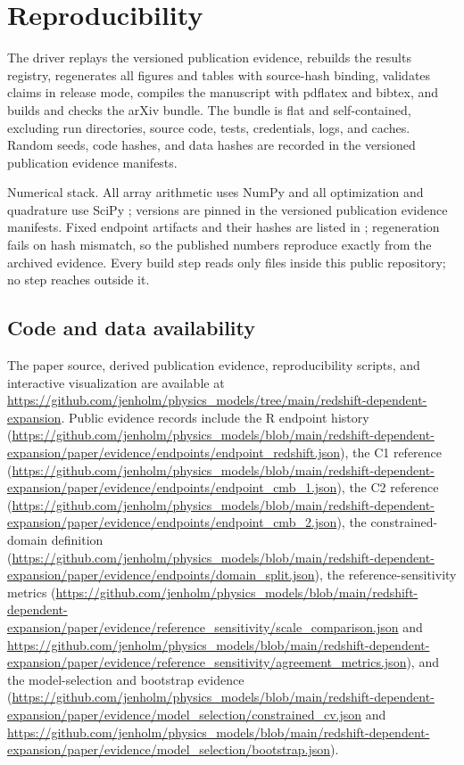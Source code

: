\section{Reproducibility}
\label{app:repro}

The driver 
replays the versioned publication evidence, rebuilds the results registry,
regenerates all figures and tables with source-hash binding, validates
claims in release mode, compiles the manuscript with pdflatex and
bibtex, and builds and checks the arXiv bundle. The bundle
 is flat and self-contained,
excluding run directories, source code, tests, credentials, logs, and
caches. Random seeds, code hashes, and data hashes are recorded in the
versioned publication evidence manifests.

Numerical stack. All array arithmetic uses NumPy \citep{Harris2020} and
all optimization and quadrature use SciPy \citep{Virtanen2020};
versions are pinned in the versioned publication evidence manifests.
Fixed endpoint artifacts and their hashes are listed in
; regeneration fails on hash
mismatch, so the published numbers reproduce exactly from the
archived evidence. Every build step reads only files inside this
public repository; no step reaches outside it.

\subsection{Code and data availability}
The paper source, derived publication evidence, reproducibility scripts, and interactive visualization are available at \url{https://github.com/jenholm/physics_models/tree/main/redshift-dependent-expansion}. Public evidence records include the R endpoint history (\url{https://github.com/jenholm/physics_models/blob/main/redshift-dependent-expansion/paper/evidence/endpoints/endpoint_redshift.json}), the C1 reference (\url{https://github.com/jenholm/physics_models/blob/main/redshift-dependent-expansion/paper/evidence/endpoints/endpoint_cmb_1.json}), the C2 reference (\url{https://github.com/jenholm/physics_models/blob/main/redshift-dependent-expansion/paper/evidence/endpoints/endpoint_cmb_2.json}), the constrained-domain definition (\url{https://github.com/jenholm/physics_models/blob/main/redshift-dependent-expansion/paper/evidence/endpoints/domain_split.json}), the reference-sensitivity metrics (\url{https://github.com/jenholm/physics_models/blob/main/redshift-dependent-expansion/paper/evidence/reference_sensitivity/scale_comparison.json} and \url{https://github.com/jenholm/physics_models/blob/main/redshift-dependent-expansion/paper/evidence/reference_sensitivity/agreement_metrics.json}), and the model-selection and bootstrap evidence (\url{https://github.com/jenholm/physics_models/blob/main/redshift-dependent-expansion/paper/evidence/model_selection/constrained_cv.json} and \url{https://github.com/jenholm/physics_models/blob/main/redshift-dependent-expansion/paper/evidence/model_selection/bootstrap.json}).
